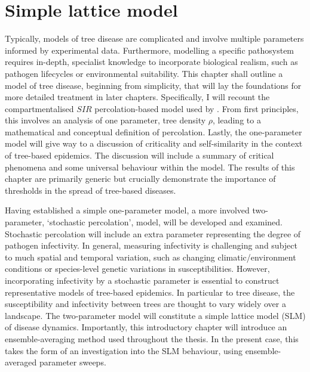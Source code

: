 
\chapter{Simple lattice model}
\label{chapter:SLM}
Typically, models of tree disease are complicated and involve multiple parameters informed by experimental data. Furthermore, modelling a specific pathosystem requires in-depth, specialist knowledge to incorporate biological realism, such as pathogen lifecycles or environmental suitability. This chapter shall outline a model of tree disease, beginning from simplicity, that will lay the foundations for more detailed treatment in later chapters. Specifically, I will recount the compartmentalised $SIR$ percolation-based model used by \cite{OROZCOFUENTES201912}. From first principles, this involves an analysis of one parameter, tree density $\rho$, leading to a mathematical and conceptual definition of percolation. Lastly, the one-parameter model will give way to a discussion of criticality and self-similarity in the context of tree-based epidemics. The discussion will include a summary of critical phenomena and some universal behaviour within the model.  The results of this chapter are primarily generic but crucially demonstrate the importance of thresholds in the spread of tree-based diseases.

Having established a simple one-parameter model, a more involved two-parameter, `stochastic percolation', model, will be developed and examined. Stochastic percolation will include an extra parameter representing the degree of pathogen infectivity. In general, measuring infectivity is challenging and subject to much spatial and temporal variation, such as changing climatic/environment conditions or species-level genetic variations in susceptibilities.  However, incorporating infectivity by a stochastic parameter is essential to construct representative models of tree-based epidemics. In particular to tree disease, the susceptibility and infectivity between trees are thought to vary widely over a landscape. The two-parameter model will constitute a simple lattice model (SLM) of disease dynamics. Importantly, this introductory chapter will introduce an ensemble-averaging method used throughout the thesis. In the present case, this takes the form of an investigation into the SLM behaviour, using ensemble-averaged parameter sweeps.

